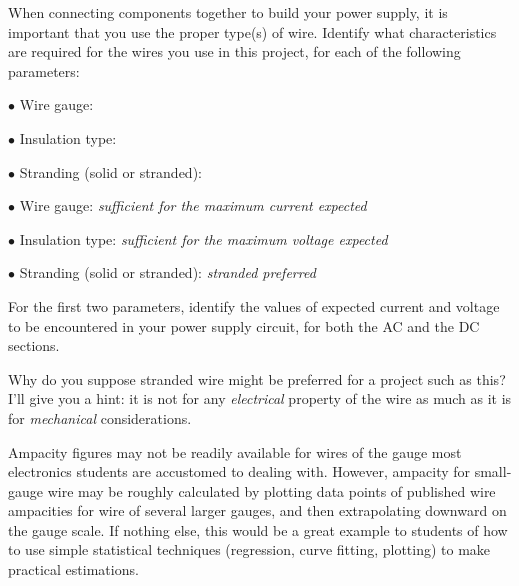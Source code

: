 

When connecting components together to build your power supply, it is important that you use the proper type(s) of wire.  Identify what characteristics are required for the wires you use in this project, for each of the following parameters:

\medskip
\item{$\bullet$} Wire gauge:
\item{$\bullet$} Insulation type:
\item{$\bullet$} Stranding (solid or stranded):
\medskip







\medskip
\item{$\bullet$} Wire gauge: {\it sufficient for the maximum current expected}
\item{$\bullet$} Insulation type: {\it sufficient for the maximum voltage expected}
\item{$\bullet$} Stranding (solid or stranded): {\it stranded preferred}
\medskip

For the first two parameters, identify the values of expected current and voltage to be encountered in your power supply circuit, for both the AC and the DC sections.

Why do you suppose stranded wire might be preferred for a project such as this?  I'll give you a hint: it is not for any {\it electrical} property of the wire as much as it is for {\it mechanical} considerations.







Ampacity figures may not be readily available for wires of the gauge most electronics students are accustomed to dealing with.  However, ampacity for small-gauge wire may be roughly calculated by plotting data points of published wire ampacities for wire of several larger gauges, and then extrapolating downward on the gauge scale.  If nothing else, this would be a great example to students of how to use simple statistical techniques (regression, curve fitting, plotting) to make practical estimations.



